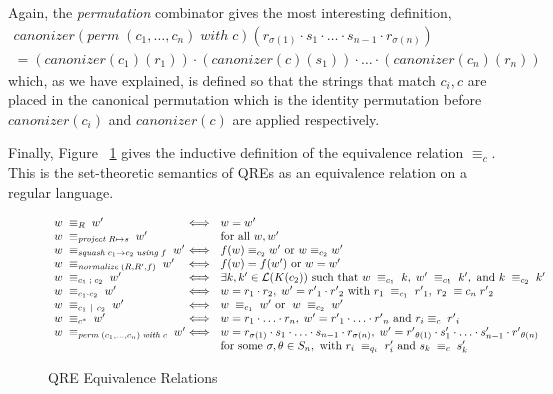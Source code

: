 \documentclass[acmsmall,review,anonymous]{acmart}
\newcommand{\kw}[1]{\ensuremath{\mathit{#1}}}
\newcommand{\project}[2]{\ensuremath{\kw{project} \; #1 \mapsto #2}}
\newcommand{\squash}[3]{\ensuremath{\kw{squash} \; #1 \rightarrow #2\; \kw{using} \; #3}}
\newcommand{\perm}[2]{\ensuremath{\kw{perm}\; (#1)\; \kw{with}\; #2}}
\newcommand{\normalize}[3]{\ensuremath{\kw{normalize} \; (#1, #2, #3)}}
\newcommand{\sep}{\ensuremath{\ | \ }}
\newcommand{\canonizer}{\ensuremath{\kw{canonizer}}}
\newcommand{\eqrel}[1]{\ensuremath{\equiv_{#1}}}
\begin{document}
Again, the \textit{permutation} combinator gives the most interesting
definition,
\begin{align*}\canonizer(\perm{c_1, \ldots, c_n}{c})(r_{\sigma(1)}
\cdot s_1 \cdot \ldots \cdot s_{n-1} \cdot r_{\sigma(n)}) \\
= (\canonizer(c_1)(r_1)) \cdot (\canonizer(c)(s_1)) \cdot \ldots \cdot
(\canonizer(c_n)(r_n))
\end{align*}
\noindent which, as we have explained, is defined so that the strings that match
$c_i, c$ are placed in the canonical permutation which is the identity
permutation before $\canonizer(c_i)$ and $\canonizer(c)$ are applied
respectively.

Finally, Figure ~\ref{fig:relations} gives the inductive definition of the
equivalence relation $\eqrel{c}$. This is the set-theoretic semantics of QREs
as an equivalence relation on a regular language.

\begin{figure}[t]
\centering
\[
\begin{array}{l@{}l@{\ \ }l}
w \; \equiv_R \; w' &\iff& w = w' \\
w \; \equiv_{\project{R}{s}} \; w' && \text{for all }w, w'\\
w \; \equiv_{\squash{c_1}{c_2}{f}} \; w' &\iff& f(w) \equiv_{c_2} w'
\text{ or } w \equiv_{c_2} w' \\
w \; \equiv_{\normalize{R}{R'}{f}} \; w' &\iff&
f(w)=f(w') \text{ or }w = w'\\
w \; \equiv_{c_1 \; ; \; c_2} \; w' &\iff& \exists k, k' \in
\mathcal{L}(K(c_2)) \text{ such that } w \; \equiv_{c_1} \; k, \; w' \;
\equiv_{c_1} \; k', \text{ and } k \; \equiv_{c_2} \; k'\\
w \; \equiv_{c_1 \cdot c_2} \; w'  &\iff& w = r_1
\cdot r_2, \; w' = {r'}_1 \cdot {r'}_2 \text{ with } r_1 \; \equiv_{c_1}
\; {r'}_1, \; r_2 \; \equiv{c_n} \; {r'}_2\\
w \; \equiv_{c_1 \sep c_2} \; w' &\iff& w \; \equiv_{c_1} \; w'
\text{ or } \; w \; \equiv_{c_2} \; w'\\
w \; \equiv_{c^*} \; w' &\iff& w = r_1 \cdot \ldots \cdot r_n, \; w'
= {r'}_1 \cdot \ldots \cdot {r'}_n \text{ and } r_i \equiv_{c} \; {r'}_i
\\
w \; \equiv_{\perm{c_1, \ldots, c_n}{c}} \; w' &\iff& w = r_{\sigma(1)}
\cdot s_1 \cdot \ldots \cdot s_{n-1} \cdot r_{\sigma(n)}, \;
w' = {r'}_{\theta(1)} \cdot s'_1 \cdot \ldots \cdot s'_{n-1}
\cdot {r'}_{\theta(n)} \\
& & \text{for some } \sigma, \theta \in S_n, \text{ with } r_i \;
\equiv_{q_i} \; r'_i \text{ and } s_k \; \equiv_{c} \; s'_{k}
\end{array}
\]
\caption{QRE Equivalence Relations}
\label{fig:relations}
\end{figure}
\end{document}
